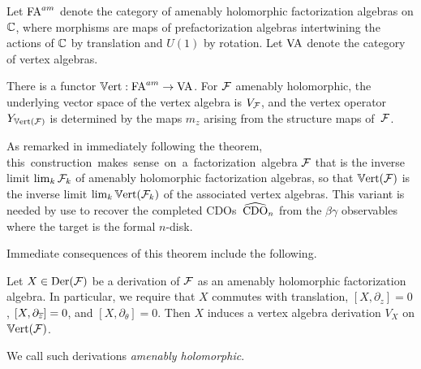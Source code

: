 Let ${\rm FA}^{am}$ denote the category of amenably holomorphic factorization algebras on $\mathbb C$,
where morphisms are maps of prefactorization algebras intertwining the actions of $\mathbb C$ by translation and $U(1)$ by rotation.
Let ${\rm VA}$ denote the category of vertex algebras.

\begin{thm} 
\label{theorem_vertex_algebra}
There is a functor $\mathbb{V}{\rm ert}:{\rm FA}^{am} \to {\rm VA}$. 
For $\mathcal F$ amenably holomorphic, the underlying vector space of the vertex algebra is $V_\mathcal F$,
and the vertex operator $Y_{\mathbb{V}{\rm ert}(\mathcal F)}$ is determined by the maps $m_z$ arising from the structure maps of~$\mathcal F$.
\end{thm}

\begin{rmk}
\label{rmk on completions}
As remarked in \cite{CG1} immediately following the theorem, \si 
this construction makes sense on a factorization algebra $\mathcal F$ that is the inverse limit $\lim_k \mathcal F_k$ of amenably holomorphic factorization algebras,
so that $\mathbb{V}{\rm ert}(\mathcal F)$ is the inverse limit $\lim_k \mathbb{V}{\rm ert}(\mathcal F_k)$ of the associated vertex algebras.
This variant is needed by use to recover the completed CDOs~$\widehat{\rm CDO}_n$ from the $\beta\gamma$ observables where the target is the formal $n$-disk.
\end{rmk}

Immediate consequences of this theorem include the following.

\begin{lemma}\label{factder}
Let $X \in {\rm Der}(\mathcal F)$ be a derivation of $\mathcal F$ as an amenably holomorphic factorization algebra. In particular, we require that $X$ commutes with translation, $[X, \partial_z] = 0$, $[X, \partial_{\overline{z}}] = 0$, and $[X, \partial_\theta] = 0$. Then $X$ induces a vertex algebra derivation $V_X$ on $\mathbb{V}{\rm ert}(\mathcal F)$.
\end{lemma}

We call such derivations {\em amenably holomorphic}.

